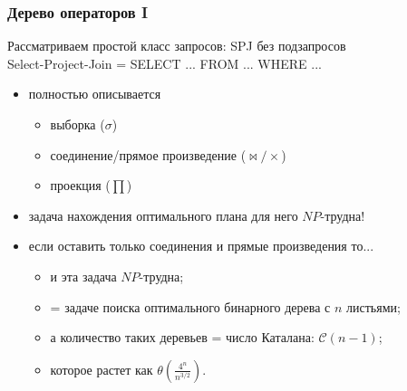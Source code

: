 \documentclass{beamer}
\begin{document}
\begin{frame}
\frametitle{Дерево операторов I}

Рассматриваем простой класс запросов: SPJ без подзапросов\\
Select-Project-Join = SELECT ... FROM ... WHERE ...
\begin{itemize}
  \setlength\itemsep{1em}
  \item полностью описывается 
  \begin{itemize}
    \item выборка ($\sigma$) 
    \item соединение/прямое произведение ($\bowtie/\times$)
    \item проекция ($ \prod$)
  \end{itemize}
  \item задача нахождения оптимального плана для него $NP$-трудна!
  \item если оставить только соединения и прямые произведения то...
  \begin{itemize}
    \item и эта задача $NP$-трудна;
    \item = задаче поиска оптимального бинарного дерева с $n$ листьями;
    \item а количество таких деревьев = число Каталана: $\mathcal{C}(n-1)$;
    \item которое растет как $\theta (\frac{4^n}{n^{3/2}})$.
  \end{itemize}

\end{itemize}

\end{frame}
\end{document}
